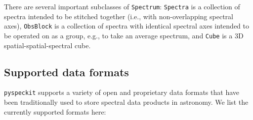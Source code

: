 \documentclass[twocolumn]{aastex62}
\newcommand{\pyspeckit}{\texttt{pyspeckit}\xspace}
\begin{document}
There are several important subclasses of \texttt{Spectrum}: \texttt{Spectra}
is a collection of spectra intended to be stitched together (i.e., with
non-overlapping spectral axes), \texttt{ObsBlock} is a collection of spectra
with identical spectral axes intended to be operated on as a group, e.g., to
take an average spectrum, and \texttt{Cube} is a 3D spatial-spatial-spectral
cube.

\subsection{Supported data formats}

\pyspeckit supports a variety of open and proprietary data formats that have
been traditionally used to store spectral data products in astronomy. 
We list the currently supported formats here:
\end{document}
